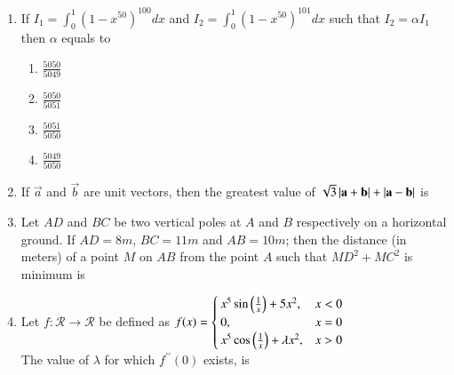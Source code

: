 \documentclass[journal]{IEEEtran}
\begin{document}
\begin{enumerate}
    \begin{multicols}{4}
    \begin{enumerate}
        \item $\frac{(t_1+t_2)}{2}$
        \item $2a(t_1+t_2)+b$
        \item $\frac{(t_2-t_1)}{2}$
        \item $a(t_2-t_1)+b$
    \end{enumerate}
    \end{multicols}
    
    \item If $I_1 = \int_{0}^{1}(1-x^{50})^{100} dx$ and $I_2 = \int_{0}^{1}(1-x^{50})^{101} dx$ such that $I_2 = \alpha I_1$ then $\alpha$ equals to
    
    \begin{multicols}{4}
    \begin{enumerate}
        \item $\frac{5050}{5049}$
        \item $\frac{5050}{5051}$
        \item $\frac{5051}{5050}$
        \item $\frac{5049}{5050}$
    \end{enumerate}
    \end{multicols}
    
    \item If $\vec{a}$ and $\vec{b}$ are unit vectors, then the greatest value of $\sqrt{3} \left\vert\mathbf{a} + \mathbf{b}\right\vert + \left\vert\mathbf{a} - \mathbf{b}\right\vert$ is \\
    
    \item Let $AD$ and $BC$ be two vertical poles at $A$ and $B$ respectively on a horizontal ground. If $AD = 8m$, $BC = 11m$ and $AB = 10m$; then the distance (in meters) of a point $M$ on $AB$ from the point $A$ such that $MD^2+MC^2$ is minimum is \\
    
    \item Let $f : \mathcal{R} \rightarrow \mathcal{R}$ be defined as $f(x)= \begin{cases}x^5\sin\left(\frac{1}{x}\right) + 5x^2,& x < 0\\
    0,& x = 0\\
    x^5\cos\left(\frac{1}{x}\right) + \lambda x^2,& x > 0\end{cases}$\\
    
    The value of $\lambda$ for which $f^{\prime\prime}(0)$ exists, is \\
    

\end{enumerate}
\end{document}
